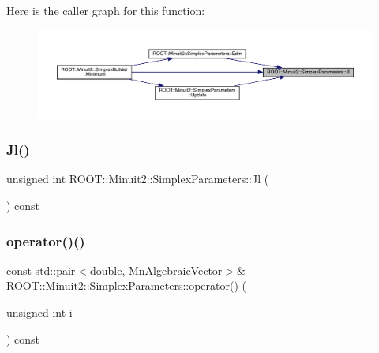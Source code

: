 Here is the caller graph for this function\+:\nopagebreak
\begin{figure}[H]
\begin{center}
\leavevmode
\includegraphics[width=350pt]{d7/da2/classROOT_1_1Minuit2_1_1SimplexParameters_accfb7ec2b1087661ed3c31dfbb473413_icgraph}
\end{center}
\end{figure}
\mbox{\label{classROOT_1_1Minuit2_1_1SimplexParameters_accfb7ec2b1087661ed3c31dfbb473413}} 
\subsubsection{\texorpdfstring{Jl()}{Jl()}\hspace{0.1cm}{\footnotesize\ttfamily [2/2]}}
{\footnotesize\ttfamily unsigned int R\+O\+O\+T\+::\+Minuit2\+::\+Simplex\+Parameters\+::\+Jl (\begin{DoxyParamCaption}{ }\end{DoxyParamCaption}) const\hspace{0.3cm}{\ttfamily [inline]}}

\mbox{\label{classROOT_1_1Minuit2_1_1SimplexParameters_aa05f3fb5da27277879fad702d85bae49}} 
\subsubsection{\texorpdfstring{operator()()}{operator()()}\hspace{0.1cm}{\footnotesize\ttfamily [1/2]}}
{\footnotesize\ttfamily const std\+::pair$<$double, \mbox{\hyperlink{namespaceROOT_1_1Minuit2_a62ed97730a1ca8d3fbaec64a19aa11c9}{Mn\+Algebraic\+Vector}}$>$\& R\+O\+O\+T\+::\+Minuit2\+::\+Simplex\+Parameters\+::operator() (\begin{DoxyParamCaption}\item[{unsigned int}]{i }\end{DoxyParamCaption}) const\hspace{0.3cm}{\ttfamily [inline]}}

